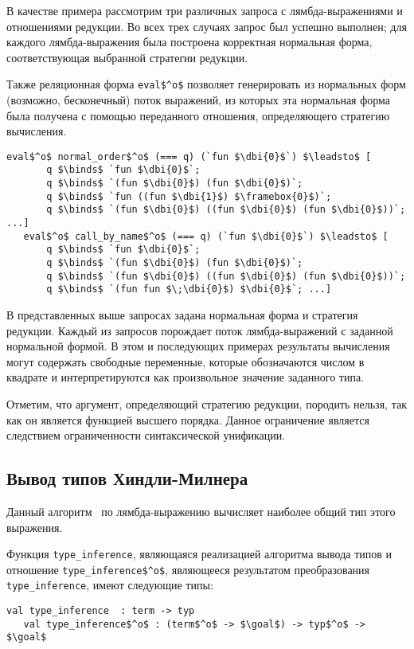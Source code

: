 В качестве примера рассмотрим три различных запроса с лямбда-выражениями и отношениями редукции. Во всех трех случаях запрос был успешно выполнен; для каждого лямбда-выражения была построена корректная нормальная форма, соответствующая выбранной стратегии редукции.

Также реляционная форма  \lstinline|eval$^o$| позволяет генерировать из нормальных форм (возможно, бесконечный) поток выражений, из которых эта нормальная форма была получена с помощью переданного отношения, определяющего стратегию вычисления.

\begin{lstlisting}[basicstyle=\small]
   eval$^o$ normal_order$^o$ (=== q) (`fun $\dbi{0}$`) $\leadsto$ [
       q $\binds$ `fun $\dbi{0}$`;
       q $\binds$ `(fun $\dbi{0}$) (fun $\dbi{0}$)`;
       q $\binds$ `fun ((fun $\dbi{1}$) $\framebox{0}$)`;
       q $\binds$ `(fun $\dbi{0}$) ((fun $\dbi{0}$) (fun $\dbi{0}$))`; ...]
   eval$^o$ call_by_name$^o$ (=== q) (`fun $\dbi{0}$`) $\leadsto$ [
       q $\binds$ `fun $\dbi{0}$`;
       q $\binds$ `(fun $\dbi{0}$) (fun $\dbi{0}$)`;
       q $\binds$ `(fun $\dbi{0}$) ((fun $\dbi{0}$) (fun $\dbi{0}$))`;
       q $\binds$ `(fun fun $\;\dbi{0}$) $\dbi{0}$`; ...]
\end{lstlisting}

В представленных выше запросах задана нормальная форма и стратегия
редукции. Каждый из запросов порождает поток лямбда-выражений с
заданной нормальной формой. В этом и последующих примерах результаты
вычисления могут содержать свободные переменные, которые обозначаются
числом в квадрате и интерпретируются как произвольное значение заданного
типа.

Отметим, что аргумент, определяющий стратегию редукции, породить нельзя,
так как он является функцией высшего порядка. Данное ограничение является
следствием ограниченности синтаксической унификации.

\subsection{Вывод типов Хиндли-Милнера}

Данный алгоритм~\cite{lozov-spbu:Barendregt} по лямбда-выражению вычисляет наиболее общий тип этого выражения.

Функция \lstinline|type_inference|, являющаяся реализацией алгоритма вывода типов и отношение \lstinline|type_inference$^o$|, являющееся результатом преобразования \lstinline|type_inference|, имеют следующие типы:
\begin{lstlisting}[basicstyle=\small]
   val type_inference  : term -> typ
   val type_inference$^o$ : (term$^o$ -> $\goal$) -> typ$^o$ -> $\goal$
\end{lstlisting}

